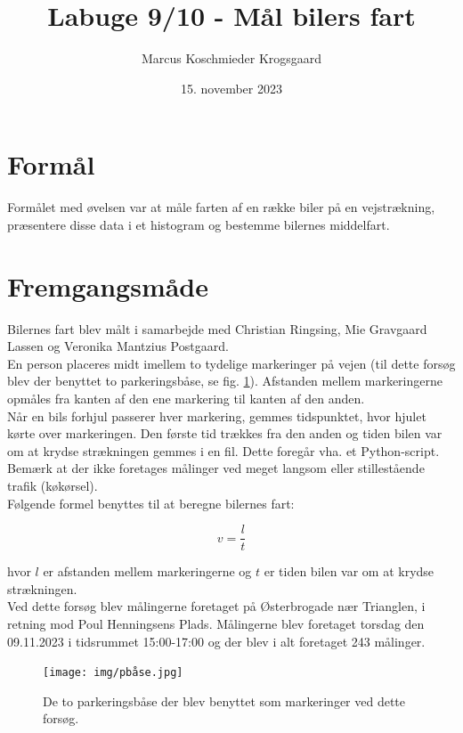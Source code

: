 \documentclass[hidelinks]{article}
\title{Labuge 9/10 - Mål bilers fart}
\author{Marcus Koschmieder Krogsgaard}
\date{15. november 2023}
\begin{document}
\maketitle

\newpage

\section{Formål}
Formålet med øvelsen var at måle farten af en række biler på en vejstrækning, præsentere disse data i et histogram og bestemme bilernes middelfart.

\section{Fremgangsmåde} \label{fremgangsmaade}
Bilernes fart blev målt i samarbejde med Christian Ringsing, Mie Gravgaard Lassen og Veronika Mantzius Postgaard.\\

En person placeres midt imellem to tydelige markeringer på vejen (til dette forsøg blev der benyttet to parkeringsbåse, se fig. \ref{fig:pplads}). Afstanden mellem markeringerne opmåles fra kanten af den ene markering til kanten af den anden.\\

Når en bils forhjul passerer hver markering, gemmes tidspunktet, hvor hjulet kørte over markeringen. Den første tid trækkes fra den anden og tiden bilen var om at krydse strækningen gemmes i en fil. Dette foregår vha. et Python-script\cite{timescript}. Bemærk at der ikke foretages målinger ved meget langsom eller stillestående trafik (køkørsel).\\

Følgende formel benyttes til at beregne bilernes fart:

\[v = \frac{l}{t}\]

hvor $l$ er afstanden mellem markeringerne og $t$ er tiden bilen var om at krydse strækningen.\\

Ved dette forsøg blev målingerne foretaget på Østerbrogade nær Trianglen, i retning mod Poul Henningsens Plads. Målingerne blev foretaget torsdag den 09.11.2023 i tidsrummet 15:00-17:00 og der blev i alt foretaget 243 målinger.\\

\begin{figure}[H]
    \centering
    \texttt{[image: img/pbåse.jpg]}
    \caption{De to parkeringsbåse der blev benyttet som markeringer ved dette forsøg.}
    \label{fig:pplads}
\end{figure}
\end{document}

